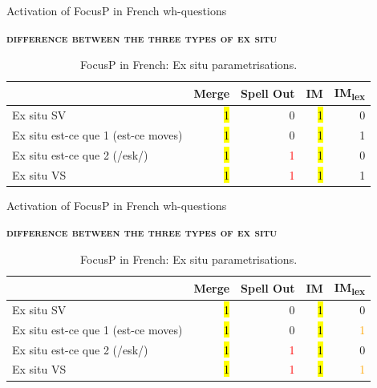 \documentclass[lesson_slides]{subfiles}
\begin{document}
\begin{frame}{Activation of FocusP in French wh-questions}

    \noindent \textbf{\textsc{difference between the three types of ex situ}}
    \vspace*{2mm}
    \begin{table}[H]
    \centering
        \begin{tabular}{|l|r|r|r|r|}
        \hline
         & Merge & Spell Out & IM & IM\textsubscript{lex} \\
         \hline
        Ex situ SV & \hl{1} & 0 & \hl{1} & 0 \\
        \hline
        Ex situ est-ce que 1 (est-ce moves) & \hl{1} & 0 & \hl{1} & 1 \\
        \hline
        Ex situ est-ce que 2 (/esk/) & \hl{1} & \textcolor{red}{1} & \hl{1} & 0 \\
        \hline
        Ex situ VS & \hl{1} & \textcolor{red}{1} & \hl{1} & 1 \\
        \hline
        \end{tabular}
    \caption{\label{tab:samp}FocusP in French: Ex situ parametrisations.}
    \end{table}
    
    
\end{frame}
\begin{frame}{Activation of FocusP in French wh-questions}

    \noindent \textbf{\textsc{difference between the three types of ex situ}}
    \vspace*{2mm}
    \begin{table}[H]
    \centering
        \begin{tabular}{|l|r|r|r|r|}
        \hline
         & Merge & Spell Out & IM & IM\textsubscript{lex} \\
         \hline
        Ex situ SV & \hl{1} & 0 & \hl{1} & 0 \\
        \hline
        Ex situ est-ce que 1 (est-ce moves) & \hl{1} & 0 & \hl{1} & \textcolor{orange}{1} \\
        \hline
        Ex situ est-ce que 2 (/esk/) & \hl{1} & \textcolor{red}{1} & \hl{1} & 0 \\
        \hline
        Ex situ VS & \hl{1} & \textcolor{red}{1} & \hl{1} & \textcolor{orange}{1} \\
        \hline
        \end{tabular}
    \caption{\label{tab:samp}FocusP in French: Ex situ parametrisations.}
    \end{table}
    
    
\end{frame}
\end{document}
